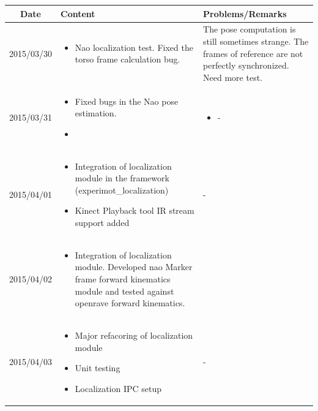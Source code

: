 \documentclass[11pt]{article} %
\begin{document}
\begin{center}
    \begin{longtable}{ | c | p{6cm} | p{5cm} |}
    \hline
    Date & Content & Problems/Remarks \\ 
    \endhead
    \hline    
     2015/03/30         & 
  \begin{itemize}
  \item Nao localization test. Fixed the torso frame calculation bug. 
\end{itemize}  
   & The pose computation is still sometimes strange. The frames of reference are not perfectly synchronized. Need more test. \\
\hline
  										 
 2015/03/31         & 
  \begin{itemize}
  \item Fixed bugs in the Nao pose estimation.
  \item 
\end{itemize}   
& 
  \begin{itemize}
  \item -
\end{itemize}  \\
\hline
  										 
  
  2015/04/01        & 
  \begin{itemize}
  \item Integration of localization module in the framework (experimot\_localization)
  \item Kinect Playback tool IR stream support added
\end{itemize}   
  										 & - \\
  \hline
  
  2015/04/02         & 
  \begin{itemize}
  \item Integration of localization module. Developed nao Marker frame forward kinematics module and tested against openrave forward kinematics.
\end{itemize}   
  & 
\\  										 \hline

  2015/04/03         & 
  \begin{itemize}
  \item Major refacoring of localization module
  \item Unit testing
  \item Localization IPC setup
\end{itemize}   
  & 
- \\
  										 \hline
  										 

\end{longtable}
\end{center}
\end{document}
